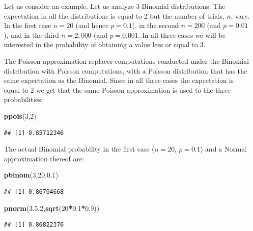 \documentclass[]{krantz}
\makeatletter
\newenvironment{Shaded}{\begin{snugshade}}{\end{snugshade}}
\newcommand{\DecValTok}[1]{\textcolor[rgb]{0.00,0.00,0.81}{#1}}
\newcommand{\FloatTok}[1]{\textcolor[rgb]{0.00,0.00,0.81}{#1}}
\newcommand{\KeywordTok}[1]{\textcolor[rgb]{0.13,0.29,0.53}{\textbf{#1}}}
\newcommand{\NormalTok}[1]{#1}
\newcommand{\OperatorTok}[1]{\textcolor[rgb]{0.81,0.36,0.00}{\textbf{#1}}}
\newenvironment{kframe}{%
\medskip{}
\setlength{\fboxsep}{.8em}
 \def\at@end@of@kframe{}%
 \ifinner\ifhmode%
  \def\at@end@of@kframe{\end{minipage}}%
  \begin{minipage}{\columnwidth}%
 \fi\fi%
 \def\FrameCommand##1{\hskip\@totalleftmargin \hskip-\fboxsep
 \colorbox{shadecolor}{##1}\hskip-\fboxsep
     \hskip-\linewidth \hskip-\@totalleftmargin \hskip\columnwidth}%
 \MakeFramed {\advance\hsize-\width
   \@totalleftmargin\z@ \linewidth\hsize
   \@setminipage}}%
 {\par\unskip\endMakeFramed%
 \at@end@of@kframe}
\renewenvironment{Shaded}{\begin{kframe}}{\end{kframe}}
\theoremstyle{definition}
\theoremstyle{definition}
\theoremstyle{definition}
\theoremstyle{remark}
\makeatother
\begin{document}
Let us consider an example. Let us analyze 3 Binomial distributions. The
expectation in all the distributions is equal to 2 but the number of
trials, \(n\), vary. In the first case \(n=20\) (and hence \(p=0.1\)), in the
second \(n=200\) (and \(p=0.01\)), and in the third \(n=2,000\) (and
\(p=0.001\). In all three cases we will be interested in the probability
of obtaining a value less or equal to 3.

The Poisson approximation replaces computations conducted under the
Binomial distribution with Poisson computations, with a Poisson
distribution that has the same expectation as the Binomial. Since in all
three cases the expectation is equal to 2 we get that the same Poisson
approximation is used to the three probabilities:

\begin{Shaded}
\begin{Highlighting}[]
\KeywordTok{ppois}\NormalTok{(}\DecValTok{3}\NormalTok{,}\DecValTok{2}\NormalTok{)}
\end{Highlighting}
\end{Shaded}

\begin{verbatim}
## [1] 0.85712346
\end{verbatim}

The actual Binomial probability in the first case (\(n=20\), \(p=0.1\)) and
a Normal approximation thereof are:

\begin{Shaded}
\begin{Highlighting}[]
\KeywordTok{pbinom}\NormalTok{(}\DecValTok{3}\NormalTok{,}\DecValTok{20}\NormalTok{,}\FloatTok{0.1}\NormalTok{)}
\end{Highlighting}
\end{Shaded}

\begin{verbatim}
## [1] 0.86704668
\end{verbatim}

\begin{Shaded}
\begin{Highlighting}[]
\KeywordTok{pnorm}\NormalTok{(}\FloatTok{3.5}\NormalTok{,}\DecValTok{2}\NormalTok{,}\KeywordTok{sqrt}\NormalTok{(}\DecValTok{20}\OperatorTok{*}\FloatTok{0.1}\OperatorTok{*}\FloatTok{0.9}\NormalTok{))}
\end{Highlighting}
\end{Shaded}

\begin{verbatim}
## [1] 0.86822376
\end{verbatim}
\end{document}
